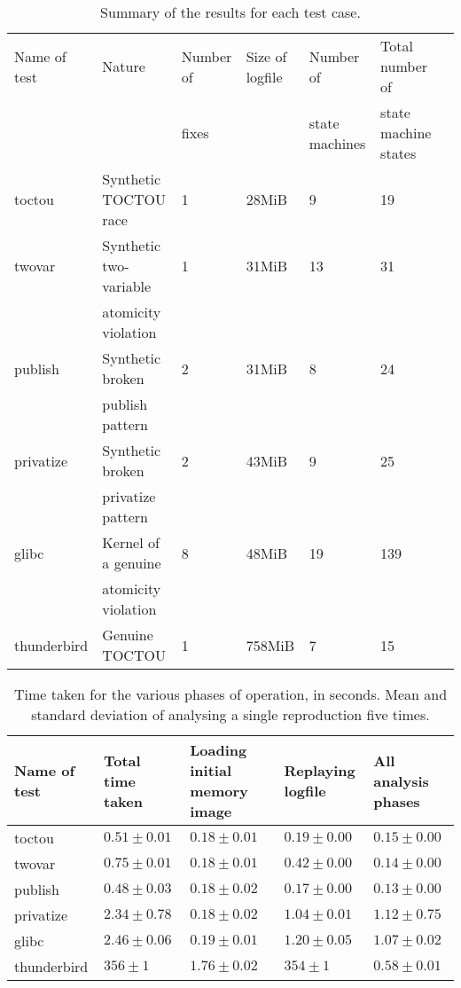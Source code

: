 \documentclass[10pt,letter,twocolumn]{sigplanconf}
\begin{document}
\begin{table*}
\begin{tabular}{lllllll}
Name of test & Nature                 & Number of & Size of logfile & Number of & Total number of \\
             &                        & fixes     &                 & state machines & state machine states \\ \hline
toctou       & Synthetic TOCTOU race  & 1        & 28MiB   & 9 & 19\\
twovar       & Synthetic two-variable & 1        & 31MiB   & 13 & 31\\
             & atomicity violation    &          & \\
publish      & Synthetic broken       & 2        & 31MiB   & 8 & 24 \\
             & publish pattern        & \\
privatize    & Synthetic broken       & 2        & 43MiB   & 9 & 25 \\
             & privatize pattern      & \\
\hline
glibc        & Kernel of a genuine    & 8        & 48MiB   & 19 & 139\\
             & atomicity violation    &          & \\
\hline
thunderbird  & Genuine TOCTOU         & 1        & 758MiB  & 7 & 15
\end{tabular}
\caption{Summary of the results for each test case.}
\label{tab:output_summary}
\end{table*}

\begin{table*}
\begin{tabular}{lllll}
Name of test & Total time taken & Loading initial memory image & Replaying logfile & All analysis phases \\ \hline
toctou       & $ 0.51 \pm 0.01$ & $ 0.18 \pm 0.01$     & $ 0.19 \pm 0.00$ & $ 0.15 \pm 0.00$\\
twovar       & $ 0.75 \pm 0.01$ & $ 0.18 \pm 0.01$     & $ 0.42 \pm 0.00$ & $ 0.14 \pm 0.00$\\
publish      & $ 0.48 \pm 0.03$ & $ 0.18 \pm 0.02$     & $ 0.17 \pm 0.00$ & $ 0.13 \pm 0.00$\\
privatize    & $ 2.34 \pm 0.78$ & $ 0.18 \pm 0.02$     & $ 1.04 \pm 0.01$ & $ 1.12 \pm 0.75$\\
\hline
glibc        & $ 2.46 \pm 0.06$ & $ 0.19 \pm 0.01$     & $ 1.20 \pm 0.05$ & $ 1.07 \pm 0.02$\\
\hline
thunderbird  & $ 356  \pm 1$    & $ 1.76 \pm 0.02$     & $ 354  \pm 1$    & $ 0.58 \pm 0.01$\\
\end{tabular}
\caption{Time taken for the various phases of operation, in seconds.
  Mean and standard deviation of analysing a single reproduction five
  times.}
\label{tab:perf_summary}
\end{table*}
\end{document}
